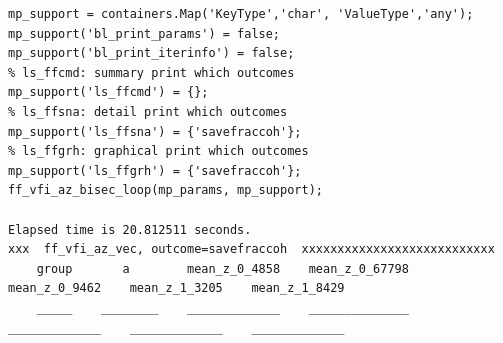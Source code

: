 \documentclass[
]{book}
\begin{document}
\begin{verbatim}
mp_support = containers.Map('KeyType','char', 'ValueType','any');
mp_support('bl_print_params') = false;
mp_support('bl_print_iterinfo') = false;
% ls_ffcmd: summary print which outcomes
mp_support('ls_ffcmd') = {};
% ls_ffsna: detail print which outcomes
mp_support('ls_ffsna') = {'savefraccoh'};
% ls_ffgrh: graphical print which outcomes
mp_support('ls_ffgrh') = {'savefraccoh'};
ff_vfi_az_bisec_loop(mp_params, mp_support);

Elapsed time is 20.812511 seconds.
xxx  ff_vfi_az_vec, outcome=savefraccoh  xxxxxxxxxxxxxxxxxxxxxxxxxxx
    group       a        mean_z_0_4858    mean_z_0_67798    mean_z_0_9462    mean_z_1_3205    mean_z_1_8429
    _____    ________    _____________    ______________    _____________    _____________    _____________


\end{verbatim}
\end{document}
